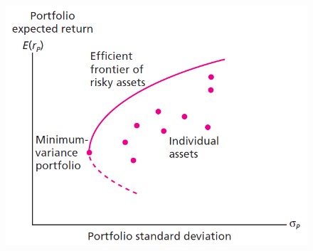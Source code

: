 \begin{figure}[h!]
  \centering
  \includegraphics[scale=0.5]{efficient_frontier.png}
\end{figure}



